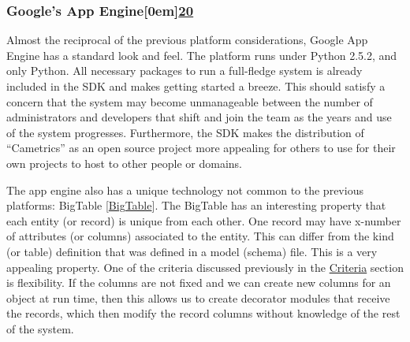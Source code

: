 \documentclass[10pt,a4paper,english]{article}
\begin{document}

\hypertarget{google-s-app-engine}{}
\subsubsection*{Google's App Engine\raisebox{.5em}[0em]{\scriptsize\hyperlink{id42}{20}}}
\label{google-s-app-engine}

Almost the reciprocal of the previous platform considerations, Google App Engine has a standard look and feel. The platform runs under Python 2.5.2, and only Python. All necessary packages to run a full-fledge system is already included in the SDK and makes getting started a breeze. This should satisfy a concern that the system may become unmanageable between the number of administrators and developers that shift and join the team as the years and use of the system progresses. Furthermore, the SDK makes the distribution of ``Cametrics'' as an open source project more appealing for others to use for their own projects to host to other people or domains.

The app engine also has a unique technology not common to the previous platforms: BigTable [\hyperlink{bigtable}{BigTable}]. The BigTable has an interesting property that each entity (or record) is unique from each other. One record may have x-number of attributes (or columns) associated to the entity. This can differ from the kind (or table) definition that was defined in a model (schema) file. This is a very appealing property. One of the criteria discussed previously in the \href{\#criteria}{Criteria} section is flexibility. If the columns are not fixed and we can create new columns for an object at run time, then this allows us to create decorator modules that receive the records, which then modify the record columns without knowledge of the rest of the system.
\end{document}
